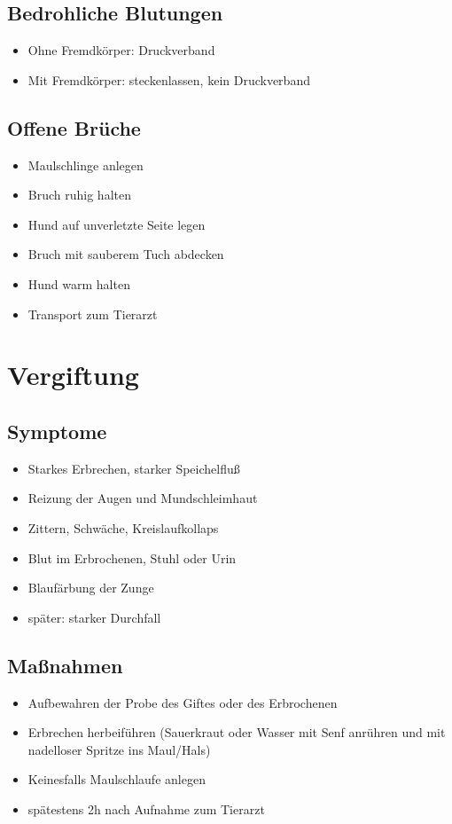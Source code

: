     \subsection{Bedrohliche Blutungen}
        \begin{itemize}
            \item Ohne Fremdkörper: Druckverband
            \item Mit Fremdkörper: steckenlassen, kein Druckverband
        \end{itemize}

    \subsection{Offene Brüche}
        \begin{itemize}
            \item Maulschlinge anlegen
            \item Bruch ruhig halten
            \item Hund auf unverletzte Seite legen
            \item Bruch mit sauberem Tuch abdecken
            \item Hund warm  halten
            \item Transport zum Tierarzt
        \end{itemize}


\section{Vergiftung}
    \subsection{Symptome}
        \begin{itemize}
            \item Starkes Erbrechen, starker Speichelfluß
            \item Reizung der Augen und Mundschleimhaut
            \item Zittern, Schwäche, Kreislaufkollaps
            \item Blut im Erbrochenen, Stuhl oder Urin
            \item Blaufärbung der Zunge
            \item später: starker Durchfall
        \end{itemize}

    \subsection{Maßnahmen}
        \begin{itemize}
            \item Aufbewahren der Probe des Giftes oder des Erbrochenen
            \item Erbrechen herbeiführen (Sauerkraut oder Wasser mit Senf anrühren und mit nadelloser Spritze ins Maul/Hals)
            \item Keinesfalls Maulschlaufe anlegen
            \item spätestens 2h nach Aufnahme zum Tierarzt
        \end{itemize}


